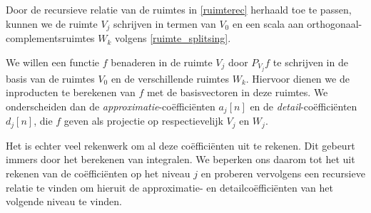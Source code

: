 Door de recursieve relatie van de ruimtes in \eqref{ruimterec} herhaald toe te passen,
kunnen we de ruimte $V_j$ schrijven in termen van $V_0$ en een scala aan
orthogonaal-complementsruimtes $W_k$ volgens \eqref{ruimte_splitsing}.

We willen een functie $f$ benaderen in de ruimte $V_j$ door $P_{V_j}f$ te schrijven in
de basis van de ruimtes $V_0$ en de verschillende ruimtes $W_k$. Hiervoor dienen we de inproducten
te berekenen van $f$ met de basisvectoren in deze ruimtes.
We onderscheiden dan de \emph{approximatie}-co\"effici\"enten $a_j[n]$ en 
de \emph{detail}-co\"effici\"enten $d_j[n]$, die
$f$ geven als projectie op  respectievelijk $V_j$ en $W_j$.

Het is echter veel rekenwerk om al deze co\"effici\"enten uit te rekenen. 
Dit gebeurt immers door het berekenen van integralen. 
We beperken ons daarom tot het uit rekenen van de co\"effici\"enten op het niveau $j$ 
en proberen vervolgens een recursieve relatie te vinden
om hieruit de approximatie- en detailco\"effici\"enten van het volgende niveau te vinden.

